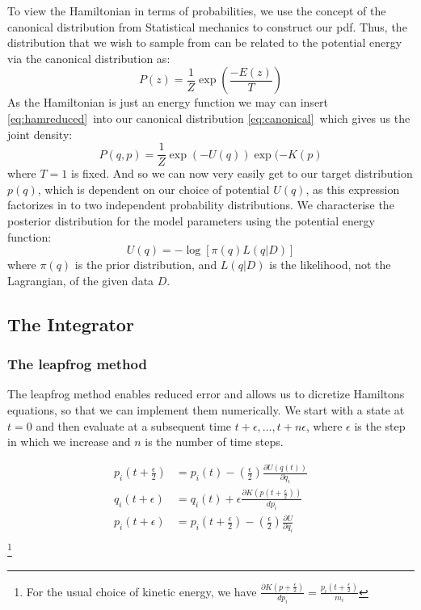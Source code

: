 \documentclass[]{report}
\begin{document}
To view the Hamiltonian in terms of probabilities, we use the concept of the canonical distribution from Statistical mechanics to construct our pdf. Thus, the distribution that we wish to sample from can be related to the potential energy via the canonical distribution as:
\begin{equation}
\label{eq:canonical}
P(z) = \frac{1}{Z}\exp\left(\frac{-E(z)}{T}\right)
\end{equation}
As the Hamiltonian is just an energy function we may can insert \ref{eq:hamreduced}\ into our canonical distribution \ref{eq:canonical}\, which gives us the joint density:
\begin{equation}
P(q,p) = \frac{1}{Z}\exp(-U(q))\exp(-K(p)  
\end{equation}
where $T = 1$ is fixed. And so we can now very easily get to our target distribution $p(q)$, which is dependent on our choice of potential $U(q)$, as this expression factorizes in to two independent probability distributions. 
We characterise the posterior distribution for the model parameters using the potential energy function: \begin{equation}
U(q) = -\log[\pi(q)L(q|D)]
\end{equation}
where $\pi(q)$ is the prior distribution, and $L(q|D)$ is the likelihood, not the Lagrangian, of the given data $D$. 

\subsection{The Integrator}

\subsubsection{The leapfrog method}
The leapfrog method enables reduced error and allows us to dicretize Hamiltons equations, so that we can implement them numerically. 
We start with a state at $t = 0$ and then evaluate at a subsequent time $t + \epsilon , \hdots, t + n\epsilon$, where $\epsilon$ is the step in which we increase and $n$ is the number of time steps. 

\begin{align}
p_{i}(t + \frac{\epsilon}{2}) &= p_{i}(t) - \left(\frac{\epsilon}{2}\right)\frac{\partial U(q(t))}{\partial q_{i}} \\
q_{i}(t + \epsilon) &= q_{i}(t) + \epsilon\frac{\partial K(p(t + \frac{\epsilon}{2}))}{dp_{i}}\\
p_{i}(t + \epsilon) &= p_{i}(t + \frac{\epsilon}{2}) - \left(\frac{\epsilon}{2}\right)\frac{\partial U}{\partial q_{i}}\\
\end{align}
\footnote{For the usual choice of kinetic energy, we have $\frac{\partial K(p + \frac{\epsilon}{2})}{dp_{i}} = \frac{p_{i}(t + \frac{\epsilon}{2})}{m_{i}}$}
\end{document}
